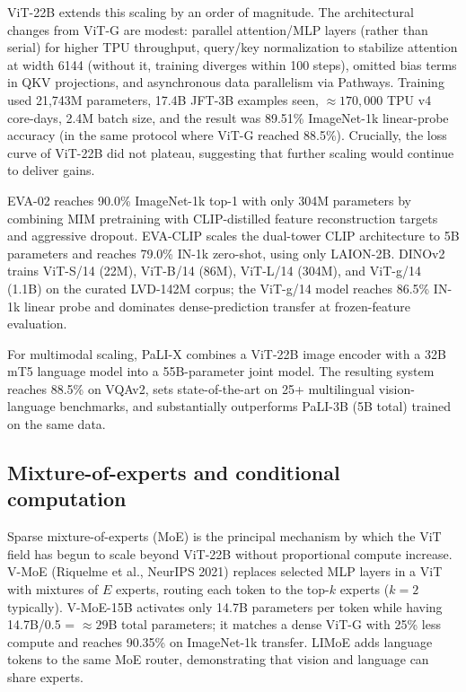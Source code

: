 \documentclass{article}
\begin{document}
ViT-22B \citep{dehghani2023scalingvisiontrans} extends this scaling by an order of magnitude. The architectural changes from ViT-G are modest: parallel attention/MLP layers (rather than serial) for higher TPU throughput, query/key normalization to stabilize attention at width 6144 (without it, training diverges within 100 steps), omitted bias terms in QKV projections, and asynchronous data parallelism via Pathways. Training used 21,743M parameters, 17.4B JFT-3B examples seen, \(\approx 170{,}000\) TPU v4 core-days, 2.4M batch size, and the result was 89.51\% ImageNet-1k linear-probe accuracy (in the same protocol where ViT-G reached 88.5\%). Crucially, the loss curve of ViT-22B did not plateau, suggesting that further scaling would continue to deliver gains.

EVA-02 \citep{sun2022vicinityvisiontran} reaches 90.0\% ImageNet-1k top-1 with only 304M parameters by combining MIM pretraining with CLIP-distilled feature reconstruction targets and aggressive dropout. EVA-CLIP scales the dual-tower CLIP architecture to 5B parameters and reaches 79.0\% IN-1k zero-shot, using only LAION-2B. DINOv2 \citep{oquab2023dinov2learningrobu} trains ViT-S/14 (22M), ViT-B/14 (86M), ViT-L/14 (304M), and ViT-g/14 (1.1B) on the curated LVD-142M corpus; the ViT-g/14 model reaches 86.5\% IN-1k linear probe and dominates dense-prediction transfer at frozen-feature evaluation.

For multimodal scaling, PaLI-X \citep{chen2023palixonscalingupam} combines a ViT-22B image encoder with a 32B mT5 language model into a 55B-parameter joint model. The resulting system reaches 88.5\% on VQAv2, sets state-of-the-art on 25+ multilingual vision-language benchmarks, and substantially outperforms PaLI-3B (5B total) trained on the same data.

\subsection{Mixture-of-experts and conditional computation}\label{mixture-of-experts-and-conditional-computation}

Sparse mixture-of-experts (MoE) is the principal mechanism by which the ViT field has begun to scale beyond ViT-22B without proportional compute increase. V-MoE (Riquelme et al., NeurIPS 2021) replaces selected MLP layers in a ViT with mixtures of \(E\) experts, routing each token to the top-\(k\) experts (\(k=2\) typically). V-MoE-15B activates only 14.7B parameters per token while having 14.7B/0.5 = \(\approx 29\)B total parameters; it matches a dense ViT-G with 25\% less compute and reaches 90.35\% on ImageNet-1k transfer. LIMoE adds language tokens to the same MoE router, demonstrating that vision and language can share experts.
\end{document}
